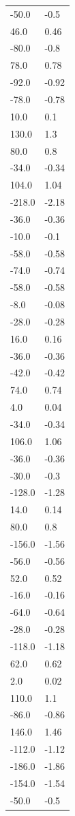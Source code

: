 \begin{longtable}{ll}
-50.0 & -0.5 \\
46.0 & 0.46 \\
-80.0 & -0.8 \\
78.0 & 0.78 \\
-92.0 & -0.92 \\
-78.0 & -0.78 \\
10.0 & 0.1 \\
130.0 & 1.3 \\
80.0 & 0.8 \\
-34.0 & -0.34 \\
104.0 & 1.04 \\
-218.0 & -2.18 \\
-36.0 & -0.36 \\
-10.0 & -0.1 \\
-58.0 & -0.58 \\
-74.0 & -0.74 \\
-58.0 & -0.58 \\
-8.0 & -0.08 \\
-28.0 & -0.28 \\
16.0 & 0.16 \\
-36.0 & -0.36 \\
-42.0 & -0.42 \\
74.0 & 0.74 \\
4.0 & 0.04 \\
-34.0 & -0.34 \\
106.0 & 1.06 \\
-36.0 & -0.36 \\
-30.0 & -0.3 \\
-128.0 & -1.28 \\
14.0 & 0.14 \\
80.0 & 0.8 \\
-156.0 & -1.56 \\
-56.0 & -0.56 \\
52.0 & 0.52 \\
-16.0 & -0.16 \\
-64.0 & -0.64 \\
-28.0 & -0.28 \\
-118.0 & -1.18 \\
62.0 & 0.62 \\
2.0 & 0.02 \\
110.0 & 1.1 \\
-86.0 & -0.86 \\
146.0 & 1.46 \\
-112.0 & -1.12 \\
-186.0 & -1.86 \\
-154.0 & -1.54 \\
-50.0 & -0.5 \\

\end{longtable}
